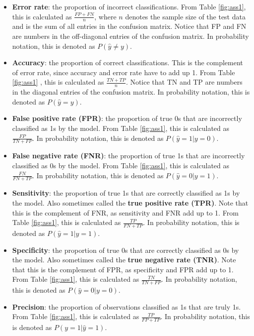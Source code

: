 \documentclass[
]{book}
\begin{document}
\begin{itemize}
\item
  \textbf{Error rate}: the proportion of incorrect classifications. From Table \ref{fig:ass1}, this is calculated as \(\frac{FP + FN}{n}\), where \(n\) denotes the sample size of the test data and is the sum of all entries in the confusion matrix. Notice that FP and FN are numbers in the off-diagonal entries of the confusion matrix. In probability notation, this is denoted as \(P(\hat{y} \neq y)\).
\item
  \textbf{Accuracy}: the proportion of correct classifications. This is the complement of error rate, since accuracy and error rate have to add up 1. From Table \ref{fig:ass1} , this is calculated as \(\frac{TN + TP}{n}\). Notice that TN and TP are numbers in the diagonal entries of the confusion matrix. In probability notation, this is denoted as \(P(\hat{y} = y)\).
\item
  \textbf{False positive rate (FPR)}: the proportion of true 0s that are incorrectly classified as 1s by the model. From Table \ref{fig:ass1}, this is calculated as \(\frac{FP}{TN + FP}\). In probability notation, this is denoted as \(P(\hat{y} = 1 | y = 0)\).
\item
  \textbf{False negative rate (FNR)}: the proportion of true 1s that are incorrectly classified as 0s by the model. From Table \ref{fig:ass1}, this is calculated as \(\frac{FN}{FN + TP}\). In probability notation, this is denoted as \(P(\hat{y} = 0 | y = 1)\).
\item
  \textbf{Sensitivity}: the proportion of true 1s that are correctly classified as 1s by the model. Also sometimes called the \textbf{true positive rate (TPR)}. Note that this is the complement of FNR, as sensitivity and FNR add up to 1. From Table \ref{fig:ass1}, this is calculated as \(\frac{TP}{FN + TP}\). In probability notation, this is denoted as \(P(\hat{y} = 1 | y = 1)\).
\item
  \textbf{Specificity}: the proportion of true 0s that are correctly classified as 0s by the model. Also sometimes called the \textbf{true negative rate (TNR)}. Note that this is the complement of FPR, as specificity and FPR add up to 1. From Table \ref{fig:ass1}, this is calculated as \(\frac{TN}{TN + FP}\). In probability notation, this is denoted as \(P(\hat{y} = 0 | y = 0)\).
\item
  \textbf{Precision}: the proportion of observations classified as 1s that are truly 1s. From Table \ref{fig:ass1}, this is calculated as \(\frac{TP}{FP + TP}\). In probability notation, this is denoted as \(P(y = 1 | \hat{y} = 1)\).
\end{itemize}
\end{document}
